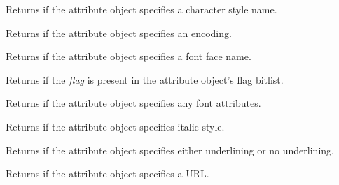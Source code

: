 \label{wxtextattrhascharacterstylename}


Returns \true if the attribute object specifies a character style name.

\label{wxtextattrhasfontencoding}


Returns \true if the attribute object specifies an encoding.

\label{wxtextattrhasfontfacename}


Returns \true if the attribute object specifies a font face name.

\label{wxtextattrhasflag}


Returns \true if the {\it flag} is present in the attribute object's flag bitlist.

\label{wxtextattrhasfont}


Returns \true if the attribute object specifies any font attributes.

\label{wxtextattrhasfontitalic}


Returns \true if the attribute object specifies italic style.

\label{wxtextattrhasfontunderlined}


Returns \true if the attribute object specifies either underlining or no underlining.

\label{wxtextattrhasurl}


Returns \true if the attribute object specifies a URL.

\label{wxtextattrhasfontweight}


